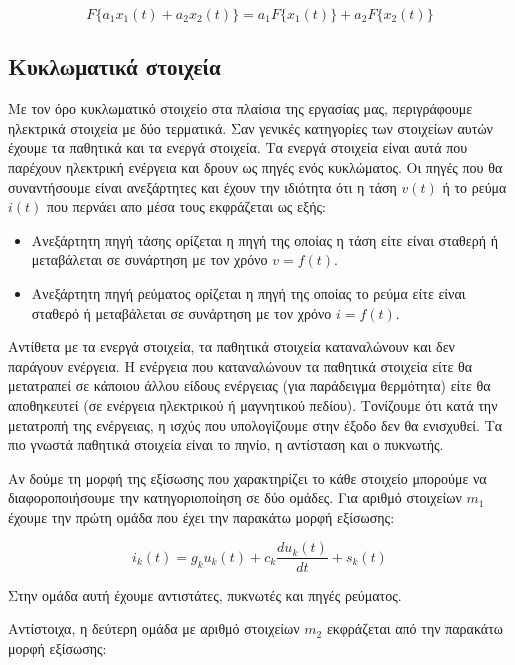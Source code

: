 \begin{equation}
    F\{a_1x_1(t) + a_2x_2(t)\} = a_1F\{x_1(t)\} + a_2F\{x_2(t)\}
\end{equation}


\subsection{Κυκλωματικά στοιχεία}

Με τον όρο κυκλωματικό στοιχείο στα πλαίσια της εργασίας μας, περιγράφουμε ηλεκτρικά στοιχεία με δύο τερματικά. Σαν γενικές κατηγορίες των στοιχείων αυτών έχουμε τα παθητικά και τα ενεργά στοιχεία. Τα ενεργά στοιχεία είναι αυτά που παρέχουν ηλεκτρική ενέργεια και δρουν ως πηγές ενός κυκλώματος. Οι πηγές που θα συναντήσουμε είναι ανεξάρτητες και έχουν την ιδιότητα ότι η τάση $v(t)$ ή το ρεύμα $i(t)$ που περνάει απο μέσα τους εκφράζεται ως εξής:
\begin{itemize}
    \item Ανεξάρτητη πηγή τάσης ορίζεται η πηγή της οποίας η τάση είτε είναι σταθερή ή μεταβάλεται σε συνάρτηση με τον χρόνο $v = f(t)$. 
    \item Ανεξάρτητη πηγή ρεύματος ορίζεται η πηγή της οποίας το ρεύμα είτε είναι σταθερό ή μεταβάλεται σε συνάρτηση με τον χρόνο $i = f(t)$.
\end{itemize}

Αντίθετα με τα ενεργά στοιχεία, τα παθητικά στοιχεία καταναλώνουν και δεν παράγουν ενέργεια. Η ενέργεια που καταναλώνουν τα παθητικά στοιχεία είτε θα μετατραπεί σε κάποιου άλλου είδους ενέργειας (για παράδειγμα θερμότητα) είτε θα αποθηκευτεί (σε ενέργεια ηλεκτρικού ή μαγνητικού πεδίου). Τονίζουμε ότι κατά την μετατροπή της ενέργειας, η ισχύς που υπολογίζουμε στην έξοδο δεν θα ενισχυθεί. Τα πιο γνωστά παθητικά στοιχεία είναι το πηνίο, η αντίσταση και ο πυκνωτής.

Αν δούμε τη μορφή της εξίσωσης που χαρακτηρίζει το κάθε στοιχείο μπορούμε να διαφοροποιήσουμε την κατηγοριοποίηση σε δύο ομάδες. Για αριθμό στοιχείων $m_1$ έχουμε την πρώτη ομάδα που έχει την παρακάτω μορφή εξίσωσης:

\begin{equation}
    i_k(t) = g_k u_k(t) + c_k \frac{du_k(t)}{dt} + s_k(t)
\end{equation}

Στην ομάδα αυτή έχουμε αντιστάτες, πυκνωτές και πηγές ρεύματος.

Αντίστοιχα, η δεύτερη ομάδα με αριθμό στοιχείων $m_2$ εκφράζεται από την παρακάτω μορφή εξίσωσης:

